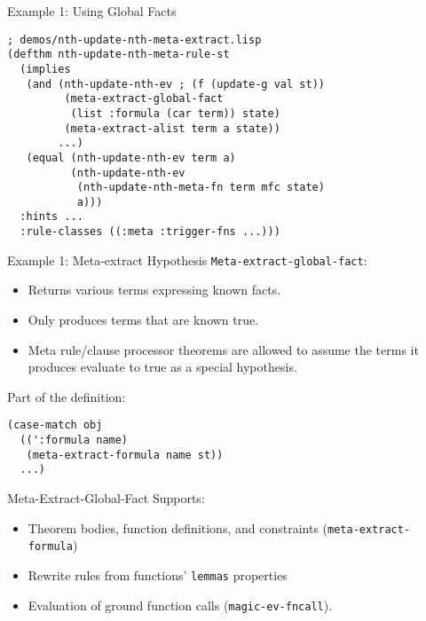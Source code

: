 \begin{frame}[fragile]{Example 1: Using Global Facts}

\begin{verbatim}
; demos/nth-update-nth-meta-extract.lisp
(defthm nth-update-nth-meta-rule-st
  (implies
   (and (nth-update-nth-ev ; (f (update-g val st))
         (meta-extract-global-fact
          (list :formula (car term)) state)
         (meta-extract-alist term a state))
        ...)
   (equal (nth-update-nth-ev term a)
          (nth-update-nth-ev
           (nth-update-nth-meta-fn term mfc state)
           a)))
  :hints ...
  :rule-classes ((:meta :trigger-fns ...)))
\end{verbatim}

\end{frame}
\begin{frame}[fragile]{Example 1: Meta-extract Hypothesis}
  \texttt{Meta-extract-global-fact}:
\begin{itemize}
\item Returns various terms expressing known facts.
\item Only produces terms that are known true.
\item Meta rule/clause processor theorems are allowed to assume the terms it produces
  evaluate to true as a special hypothesis.
\end{itemize}
Part of the definition:
\begin{Verbatim}[formatcom=\small]
(case-match obj
  ((':formula name)
   (meta-extract-formula name st))
  ...)
\end{Verbatim}
\end{frame}
\begin{frame}[fragile]{Meta-Extract-Global-Fact}
Supports:
\begin{itemize}
\item Theorem bodies, function definitions, and constraints (\texttt{meta-extract-formula})
\item Rewrite rules from functions' \texttt{lemmas} properties
\item Evaluation of ground function calls (\texttt{magic-ev-fncall}).
\end{itemize}
\end{frame}
